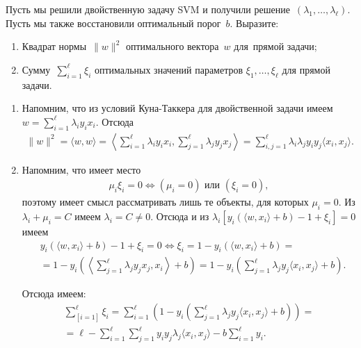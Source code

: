 \documentclass[12pt,fleqn]{article}
\begin{document}
\begin{vkProblem}
	Пусть мы решили двойственную задачу SVM и получили
	решение~$(\lambda_1, \dots, \lambda_{\ell})$.
	Пусть мы также восстановили оптимальный порог~$b$.
	Выразите:
	\begin{enumerate}
		\item Квадрат нормы~$\|w\|^2$ оптимального вектора~$w$ для~прямой задачи;
		\item Сумму~$\sum_{i=1}^{\ell} \xi_i$ оптимальных значений
		параметров $\xi_1, \dots, \xi_{\ell}$ для прямой задачи.
	\end{enumerate}
\end{vkProblem}

\vspace{1cm}

\begin{esSolution}
	\begin{enumerate}
		\item 
	Напомним, что из условий Куна-Таккера для двойственной задачи имеем $w = \sum_{i=1}^\ell \lambda_i y_i x_i$. Отсюда
	\begin{align*}
		\|w\|^2 = \langle w, w\rangle = \left\langle \sum_{i=1}^\ell \lambda_i y_i x_i, \sum_{j=1}^\ell \lambda_j y_j x_j \right\rangle = \sum_{i, j = 1}^\ell \lambda_i \lambda_j y_i y_j \langle x_i, x_j\rangle.
	\end{align*}
	\item Напомним, что имеет место
	\begin{align*}
		\mu_i \xi_i =0 \Leftrightarrow (\mu_i = 0) \text{ или } (\xi_i = 0),
	\end{align*}
	поэтому имеет смысл рассматривать лишь те объекты, для которых $\mu_i = 0.$ Из $\lambda_i + \mu_i = C$ имеем $\lambda_i = C \ne 0.$ Отсюда и из $\lambda_i [y_i \left( \langle w, x_i\rangle + b  \right) - 1 + \xi_i] = 0$ имеем 
	\begin{align*}
		&y_i \left( \langle w, x_i\rangle + b  \right) - 1 + \xi_i = 0 \Leftrightarrow \xi_i = 1 - y_i \left( \langle w, x_i\rangle + b  \right) = \\
		&= 1 - y_i \left( \left\langle \sum_{j=1}^\ell \lambda_j y_j x_j , x_i \right\rangle + b  \right) = 1 - y_i \left( \sum_{j=1}^\ell \lambda_j y_j \langle x_i, x_j\rangle + b\right).
	\end{align*}
	
	Отсюда имеем:
	\begin{align*}
		\sum_{[i=1]}^{\ell} \xi_i = \sum_{i=1}^\ell \left( 1 - y_i \left( \sum_{j=1}^\ell \lambda_j y_j \langle x_i, x_j\rangle + b\right) \right) = \\
		= \ell - \sum_{i=1}^\ell \sum_{j=1}^\ell y_i y_j \lambda_j \langle x_i, x_j\rangle - b \sum_{i=1}^\ell y_i. 
	\end{align*}
	\end{enumerate}
\end{esSolution}
\end{document}
